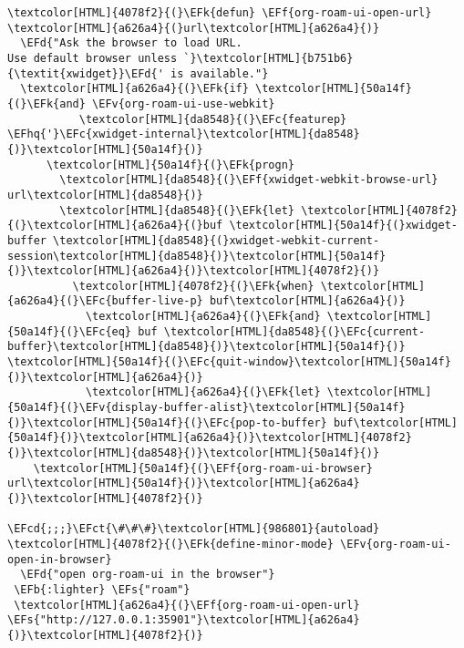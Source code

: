 \documentclass{scrartcl}
\newcommand{\EFk}[1]{\textcolor{EFk}{#1}} %
\newcommand{\EFd}[1]{\textcolor{EFd}{\textit{#1}}} %
\newcommand{\EFs}[1]{\textcolor{EFs}{#1}} %
\newcommand{\EFb}[1]{\textcolor{EFb}{#1}} %
\newcommand{\EFct}[1]{\textcolor{EFct}{#1}} %
\newcommand{\EFc}[1]{\textcolor{EFc}{#1}} %
\newcommand{\EFv}[1]{\textcolor{EFv}{#1}} %
\newcommand{\EFf}[1]{\textcolor{EFf}{#1}} %
\newcommand{\EFcd}[1]{\textcolor{EFcd}{#1}} %
\newcommand{\EFhq}[1]{\textcolor{EFhq}{#1}} %
\begin{document}
\begin{Code}
\begin{Verbatim}[]
\textcolor[HTML]{4078f2}{(}\EFk{defun} \EFf{org-roam-ui-open-url} \textcolor[HTML]{a626a4}{(}url\textcolor[HTML]{a626a4}{)}
  \EFd{"Ask the browser to load URL.
Use default browser unless `}\textcolor[HTML]{b751b6}{\textit{xwidget}}\EFd{' is available."}
  \textcolor[HTML]{a626a4}{(}\EFk{if} \textcolor[HTML]{50a14f}{(}\EFk{and} \EFv{org-roam-ui-use-webkit}
           \textcolor[HTML]{da8548}{(}\EFc{featurep} \EFhq{'}\EFc{xwidget-internal}\textcolor[HTML]{da8548}{)}\textcolor[HTML]{50a14f}{)}
      \textcolor[HTML]{50a14f}{(}\EFk{progn}
        \textcolor[HTML]{da8548}{(}\EFf{xwidget-webkit-browse-url} url\textcolor[HTML]{da8548}{)}
        \textcolor[HTML]{da8548}{(}\EFk{let} \textcolor[HTML]{4078f2}{(}\textcolor[HTML]{a626a4}{(}buf \textcolor[HTML]{50a14f}{(}xwidget-buffer \textcolor[HTML]{da8548}{(}xwidget-webkit-current-session\textcolor[HTML]{da8548}{)}\textcolor[HTML]{50a14f}{)}\textcolor[HTML]{a626a4}{)}\textcolor[HTML]{4078f2}{)}
          \textcolor[HTML]{4078f2}{(}\EFk{when} \textcolor[HTML]{a626a4}{(}\EFc{buffer-live-p} buf\textcolor[HTML]{a626a4}{)}
            \textcolor[HTML]{a626a4}{(}\EFk{and} \textcolor[HTML]{50a14f}{(}\EFc{eq} buf \textcolor[HTML]{da8548}{(}\EFc{current-buffer}\textcolor[HTML]{da8548}{)}\textcolor[HTML]{50a14f}{)} \textcolor[HTML]{50a14f}{(}\EFc{quit-window}\textcolor[HTML]{50a14f}{)}\textcolor[HTML]{a626a4}{)}
            \textcolor[HTML]{a626a4}{(}\EFk{let} \textcolor[HTML]{50a14f}{(}\EFv{display-buffer-alist}\textcolor[HTML]{50a14f}{)}\textcolor[HTML]{50a14f}{(}\EFc{pop-to-buffer} buf\textcolor[HTML]{50a14f}{)}\textcolor[HTML]{a626a4}{)}\textcolor[HTML]{4078f2}{)}\textcolor[HTML]{da8548}{)}\textcolor[HTML]{50a14f}{)}
    \textcolor[HTML]{50a14f}{(}\EFf{org-roam-ui-browser} url\textcolor[HTML]{50a14f}{)}\textcolor[HTML]{a626a4}{)}\textcolor[HTML]{4078f2}{)}

\EFcd{;;;}\EFct{\#\#\#}\textcolor[HTML]{986801}{autoload}
\textcolor[HTML]{4078f2}{(}\EFk{define-minor-mode} \EFv{org-roam-ui-open-in-browser}
  \EFd{"open org-roam-ui in the browser"}
 \EFb{:lighter} \EFs{"roam"}
 \textcolor[HTML]{a626a4}{(}\EFf{org-roam-ui-open-url} \EFs{"http://127.0.0.1:35901"}\textcolor[HTML]{a626a4}{)}\textcolor[HTML]{4078f2}{)}
\end{Verbatim}
\end{Code}
\end{document}
